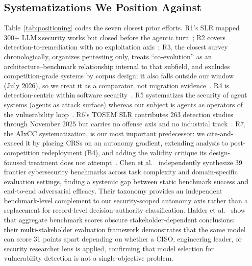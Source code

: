 \documentclass[conference,compsoc]{IEEEtran}
\begin{document}
\subsection{Systematizations We Position Against}
Table~\ref{tab:positioning} codes the seven closest prior efforts. R1's SLR mapped
300+ LLM$\times$security works but closed before the agentic turn~\cite{r1slr2024}; R2
covers detection-to-remediation with no exploitation axis~\cite{r2slr2024}; R3, the
closest survey chronologically, organizes pentesting only, treats ``co-evolution'' as an
architecture--benchmark relationship internal to that subfield, and excludes competition-grade
systems by corpus design; it also falls outside our window (July 2026), so we treat it as a
comparator, not migration evidence~\cite{r3survey2026}. R4 is detection-centric within
software security~\cite{r4csur2025}. R5 systematizes the security of agent systems (agents
as attack surface) whereas our subject is agents as operators of the vulnerability
loop~\cite{r5usenix26agentic}. R6's TOSEM SLR contributes 263 detection studies through
November 2025 but carries no offense axis and no industrial track~\cite{r6tosem2026}. R7, the AIxCC
systematization, is our most important predecessor: we cite-and-exceed it by placing CRSs on
an autonomy gradient, extending analysis to post-competition redeployment (B4), and adding the
validity critique its design-focused treatment does not attempt~\cite{r7sokaixcc2026}.
Chen et al.~\cite{chen3dtaxonomy2026} independently synthesize 39 frontier cybersecurity
benchmarks across task complexity and domain-specific evaluation settings, finding a systemic
gap between static benchmark success and end-to-end adversarial efficacy. Their taxonomy
provides an independent benchmark-level complement to our security-scoped autonomy axis rather
than a replacement for record-level decision-authority classification. Halder et
al.~\cite{seclens2026} show that aggregate benchmark scores obscure stakeholder-dependent
conclusions: their multi-stakeholder evaluation framework demonstrates that the same model can
score 31 points apart depending on whether a CISO, engineering leader, or security researcher
lens is applied, confirming that model selection for vulnerability detection is not a
single-objective problem.
\end{document}
